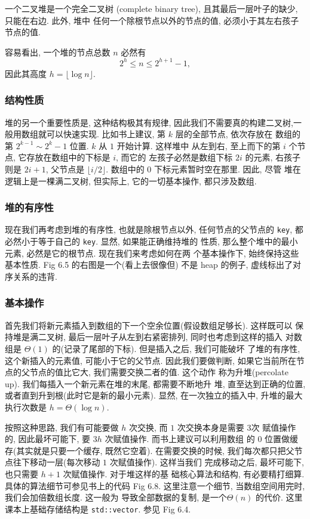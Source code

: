 \documentclass[a4paper]{ctexart}
\theoremstyle{definition}
\theoremstyle{definition}
\begin{document}
 一个二叉堆是一个完全二叉树
(complete binary tree), 且其最后一层叶子的缺少, 只能在右边. 此外, 堆中
任何一个除根节点以外的节点的值, 必须小于其左右孩子节点的值.

容易看出, 一个堆的节点总数 $n$ 必然有
$$
2^h \leq n \leq 2^{h + 1} - 1,
$$
因此其高度 $h = \lfloor \log n \rfloor$.

\subsubsection{结构性质}

堆的另一个重要性质是, 这种结构极其有规律, 因此我们不需要真的构建二叉树,一
般用数组就可以快速实现. 比如书上建议, 第 $k$ 层的全部节点, 依次存放在
数组的第 $2^{k-1} \sim 2^{k} - 1$ 位置. $k$ 从 $1$ 开始计算. 这样堆中
从左到右, 至上而下的第 $i$ 个节点, 它存放在数组中的下标是 $i$, 而它的
左孩子必然是数组下标 $2i$ 的元素, 右孩子则是 $2i + 1$, 父节点是
$\lfloor i / 2\rfloor$. 数组中的 $0$ 下标元素暂时空在那里. 因此, 尽管
堆在逻辑上是一棵满二叉树, 但实际上, 它的一切基本操作, 都只涉及数组.

\subsubsection{堆的有序性}

现在我们再考虑到堆的有序性, 也就是除根节点以外, 任何节点的父节点的
\verb|key|, 都必然小于等于自己的 \verb|key|. 显然, 如果能正确维持堆的
性质, 那么整个堆中的最小元素, 必然是它的根节点. 现在我们来考虑如何在两
个基本操作下, 始终保持这些基本性质. Fig 6.5 的右图是一个(看上去很像但)
不是 heap 的例子, 虚线标出了对序关系的违背.


\subsubsection{基本操作}
首先我们将新元素插入到数组的下一个空余位置(假设数组足够长). 这样既可以
保持堆是满二叉树, 最后一层叶子从左到右紧密排列, 同时也考虑到这样的插入
对数组是 $\Theta(1)$ 的(记录了尾部的下标). 但是插入之后, 我们可能破坏
了堆的有序性, 这个新插入的元素值, 可能小于它的父节点. 因此我们要做判断,
如果它当前所在节点的父节点的值比它大, 我们需要交换二者的值.  这个动作
称为升堆(percolate up). 我们每插入一个新元素在堆的末尾, 都需要不断地升
堆, 直至达到正确的位置, 或者直到升到根(此时它是新的最小元素).  显然,
在一次独立的插入中, 升堆的最大执行次数是 $h = \Theta(\log n)$.

按照这种思路, 我们有可能要做 $h$ 次交换, 而 $1$ 次交换本身是需要 $3$次
赋值操作的, 因此最坏可能下, 要 $3h$ 次赋值操作. 而书上建议可以利用数组
的 $0$ 位置做缓存(其实就是只要一个缓存, 既然它空着). 在需要交换的时候,
我们每次都只把父节点往下移动一层(每次移动 $1$ 次赋值操作). 这样当我们
完成移动之后, 最坏可能下, 也只需要 $h + 1$ 次赋值操作. 对于堆这样的基
础核心算法和结构, 有必要精打细算. 具体的算法细节可参见书上的代码 Fig
6.8. 这里注意一个细节, 当数组空间用完时, 我们会加倍数组长度. 这一般为
导致全部数据的复制, 是一个$\Theta(n)$ 的代价. 这里课本上基础存储结构是
\verb|std::vector|. 参见 Fig 6.4.
\end{document}
